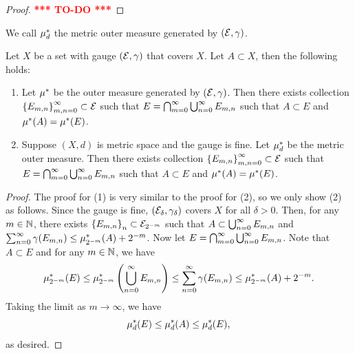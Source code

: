 \documentclass[a4paper]{article}
\newcommand{\TODO}{\textcolor{red}{\textbf{*** TO-DO ***}}}
\begin{document}
\begin{proof}
  \TODO
\end{proof}

\begin{defi}
  We call $\mu^*_d$ the metric outer measure generated
  by $(\mathcal{E}, \gamma)$.
\end{defi}

\begin{lemma}
  Let $X$ be a set with gauge $(\mathcal{E}, \gamma)$ that covers
  $X$. Let $A \subset X$, then the following holds:
  \begin{enumerate}
    \item Let $\mu^*$ be the outer measure generated
    by $(\mathcal{E}, \gamma)$. Then there exists collection
    $\left\{ E_{m,n} \right\}_{m, n= 0}^\infty \subset \mathcal{E}$
    such that $E = \bigcap_{m=0}^\infty \bigcup_{n=0}^\infty E_{m, n}$ such that
    $A \subset E$ and $\mu^*(A) = \mu^*(E)$.

    \item Suppose $(X, d)$ is metric space and the gauge is
    fine.
    Let $\mu^*_d$ be the metric outer measure. Then there exists collection
    $\left\{ E_{m,n} \right\}_{m, n= 0}^\infty \subset \mathcal{E}$
    such that $E = \bigcap_{m=0}^\infty \bigcup_{n=0}^\infty E_{m, n}$ such that
    $A \subset E$ and $\mu^*(A) = \mu^*(E)$.
  \end{enumerate}
\end{lemma}

\begin{proof}
The proof for (1) is very similar to the proof for (2),
so we only show (2) as follows.
Since the gauge is fine, $(\mathcal{E}_\delta, \gamma_\delta)$
covers $X$ for all $\delta > 0$. Then, for any $m \in \mathbb{N}$,
there exists $\left\{ E_{m, n} \right\}_{n} \subset
\mathcal{E}_{2^{-m}}$ such that $A \subset \bigcup_{n=0}^\infty E_{m, n}$
and $\sum_{n=0}^\infty \gamma(E_{m, n}) \leq \mu^*_{2^{-m}}(A) + 2^{-m}$.
Now let $E = \bigcap_{m=0}^\infty \bigcup_{n=0}^\infty E_{m, n}$. Note that
$A \subset E$ and for any $m \in \mathbb{N}$, we have
\[
\mu^*_{2^{-m}} (E) \leq \mu^*_{2^{-m}} \left( \bigcup_{n=0}^\infty E_{m, n} \right)
\leq \sum_{n=0}^\infty \gamma(E_{m, n}) \leq \mu^*_{2^{-m}} (A) + 2^{-m}.
\]
Taking the limit as $m \to \infty$, we have
\[
\mu^*_d (E) \leq \mu^*_d(A) \leq \mu^*_d(E),
\]
as desired.

\end{proof}
\end{document}
